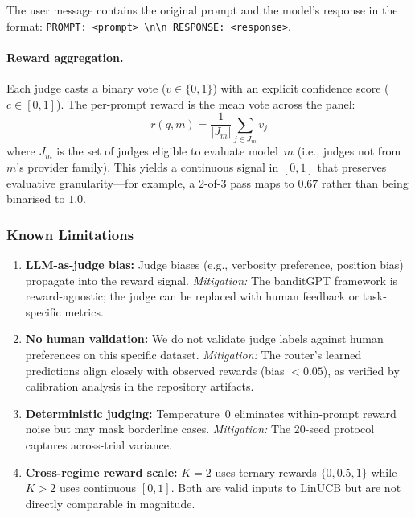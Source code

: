 The user message contains the original prompt and the model's response in the format: \texttt{PROMPT: <prompt> \textbackslash n\textbackslash n RESPONSE: <response>}.

\paragraph{Reward aggregation.}
Each judge casts a binary vote ($v \in \{0, 1\}$) with an explicit confidence score ($c \in [0, 1]$).
The per-prompt reward is the mean vote across the panel:
\begin{equation}
r(q, m) = \frac{1}{|J_m|} \sum_{j \in J_m} v_j
\end{equation}
where $J_m$ is the set of judges eligible to evaluate model~$m$ (i.e., judges not from $m$'s provider family).
This yields a continuous signal in $[0, 1]$ that preserves evaluative granularity---for example, a 2-of-3 pass maps to $0.67$ rather than being binarised to $1.0$.

\subsubsection{Known Limitations}

\begin{enumerate}[leftmargin=*,noitemsep]
    \item \textbf{LLM-as-judge bias:} Judge biases (e.g., verbosity preference, position bias) propagate into the reward signal.
          \emph{Mitigation:} The banditGPT framework is reward-agnostic; the judge can be replaced with human feedback or task-specific metrics.
    \item \textbf{No human validation:} We do not validate judge labels against human preferences on this specific dataset.
          \emph{Mitigation:} The router's learned predictions align closely with observed rewards (bias $< 0.05$), as verified by calibration analysis in the repository artifacts.
    \item \textbf{Deterministic judging:} Temperature~0 eliminates within-prompt reward noise but may mask borderline cases.
          \emph{Mitigation:} The 20-seed protocol captures across-trial variance.
    \item \textbf{Cross-regime reward scale:} $K{=}2$ uses ternary rewards $\{0, 0.5, 1\}$ while $K{>}2$ uses continuous $[0, 1]$. Both are valid inputs to LinUCB but are not directly comparable in magnitude.
\end{enumerate}

